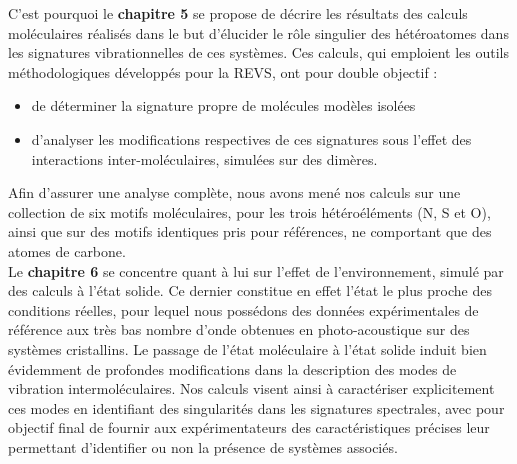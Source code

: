 	C'est pourquoi le \textbf{chapitre 5} se propose de décrire les résultats des calculs moléculaires réalisés dans le but d'élucider le rôle singulier des hétéroatomes dans les signatures vibrationnelles de ces systèmes. Ces calculs, qui emploient les outils méthodologiques développés pour la REVS, ont pour double objectif : 
	\begin{itemize}
	\item de déterminer la signature propre de molécules modèles isolées
	\item d'analyser les modifications respectives de ces signatures sous l'effet des interactions inter-moléculaires, simulées sur des dimères. 
	\end{itemize}

	Afin d'assurer une analyse complète, nous avons mené nos calculs sur une collection de six motifs moléculaires, pour les trois hétéroéléments (N, S et O), ainsi que sur des motifs identiques pris pour références, ne comportant que des atomes de carbone.\\


	Le \textbf{chapitre 6} se concentre quant à lui sur l'effet de l'environnement, simulé par des calculs à l'état solide. Ce dernier constitue en effet l'état le plus proche des conditions réelles, pour lequel nous possédons des données expérimentales de référence aux très bas nombre d'onde obtenues en photo-acoustique sur des systèmes cristallins. Le passage de l'état moléculaire à l'état solide induit bien évidemment de profondes modifications dans la description des modes de vibration intermoléculaires. Nos calculs visent ainsi à caractériser explicitement ces modes en identifiant des singularités dans les signatures spectrales, avec pour objectif final de fournir aux expérimentateurs des caractéristiques précises leur permettant d'identifier ou non la présence de systèmes associés. \\ 
	

